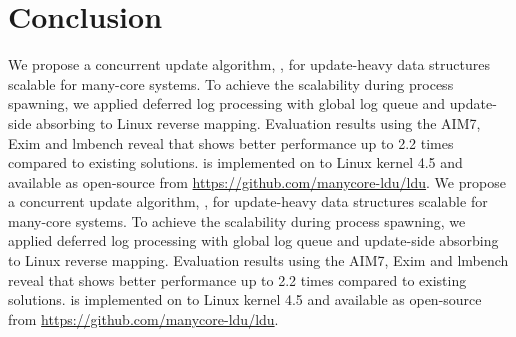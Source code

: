 \section{Conclusion}
\ifkor
We propose a concurrent update algorithm, , for update-heavy data
structures scalable for many-core systems.
To achieve the scalability during process spawning, 
we applied deferred log processing with global log queue and 
update-side absorbing to Linux reverse mapping.
Evaluation results using the AIM7, Exim and lmbench reveal that  shows
better performance up to 2.2 times compared to existing solutions.
 is implemented on to Linux kernel 4.5 and available as open-source
 from \url{https://github.com/manycore-ldu/ldu}.
\else
We propose a concurrent update algorithm, , for update-heavy data
structures scalable for many-core systems.
To achieve the scalability during process spawning, 
we applied deferred log processing with global log queue and 
update-side absorbing to Linux reverse mapping.
Evaluation results using the AIM7, Exim and lmbench reveal that  shows
better performance up to 2.2 times compared to existing solutions.
 is implemented on to Linux kernel 4.5 and available as open-source
 from \url{https://github.com/manycore-ldu/ldu}.
\fi








